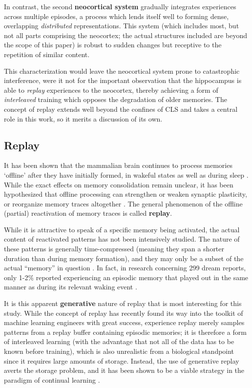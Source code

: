 \documentclass[11pt]{article}
\theoremstyle{remark}
\begin{document}
In contrast, the second \textbf{neocortical system} gradually integrates experiences across multiple episodes, a process which lends itself well to forming dense, overlapping \textit{distributed} representations. This system (which includes most, but not all parts comprising the neocortex; the actual structures included are beyond the scope of this paper) is robust to sudden changes but receptive to the repetition of similar content.

This characterization would leave the neocortical system prone to catastrophic interference, were it not for the important observation that the hippocampus is able to \textit{replay} experiences to the neocortex, thereby achieving a form of \textit{interleaved} training which opposes the degradation of older memories. The concept of replay extends well beyond the confines of CLS and takes a central role in this work, so it merits a discussion of its own.

\subsection{Replay}

It has been shown that the mammalian brain continues to process memories `offline' after they have initially formed, in wakeful states as well as during sleep \cite{ji2007coordinated, tang2017hippocampal}. While the exact effects on memory consolidation remain unclear, it has been hypothesized that offline processing can strengthen or weaken synaptic plasticity, or reorganize memory traces altogether \cite{genzel2014light}. The general phenomenon of the offline (partial) reactivation of memory traces is called \textbf{replay}.

While it is attractive to speak of a specific memory being activated, the actual content of reactivated patterns has not been intensively studied. The nature of these patterns is generally time-compressed (meaning they span a shorter duration than during memory formation), and they may only be a subset of the actual ``memory'' in question \cite{genzel2014light}. In fact, in research concerning 299 dream reports, only 1-2\% reported experiencing an episodic memory that played out in the same manner as during its relevant waking event \cite{fosse2003dreaming}.

It is this apparent \textbf{generative} nature of replay that is most interesting for this study. While the concept of replay has recently found its way into the toolkit of machine learning engineers \cite{schaul2016prioritized} with great success, experience replay merely samples patterns from a replay buffer containing episodic memories; it is therefore a form of interleaved learning (with the advantage that not all of the data has to be known before training), which is also unrealistic from a biological standpoint since it requires large amounts of storage. Instead, the use of generative replay averts the storage problem, and it has been shown to be a viable strategy in the paradigm of continual learning \cite{ven2020brain}.
\end{document}
